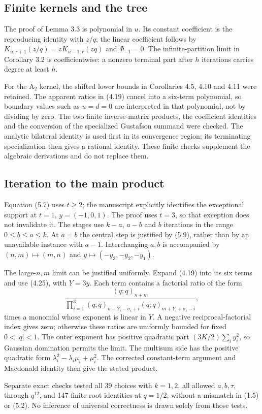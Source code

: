 \documentclass[10pt]{article}
\begin{document}
\subsection*{Finite kernels and the tree}
The proof of Lemma 3.3 is polynomial in \(u\). Its constant coefficient is the reproducing identity with \(z/q\); the linear coefficient follows by \(K_{n;r+1}(z/q)=zK_{n-1;r}(zq)\) and \(\Phi_{-1}=0\). The infinite-partition limit in Corollary 3.2 is coefficientwise: a nonzero terminal part after \(h\) iterations carries degree at least \(h\).\par
For the \(\mathrm A_2\) kernel, the shifted lower bounds in Corollaries 4.5, 4.10 and 4.11 were retained. The apparent ratios in (4.19) cancel into a six-term polynomial, so boundary values such as \(u=d=0\) are interpreted in that polynomial, not by dividing by zero. The two finite inverse-matrix products, the coefficient identities and the conversion of the specialized Gustafson summand were checked. The analytic bilateral identity is used first in its convergence region; its terminating specialization then gives a rational identity. These finite checks supplement the algebraic derivations and do not replace them.\par
\subsection*{Iteration to the main product}
Equation (5.7) uses \(t\ge2\); the manuscript explicitly identifies the exceptional support at \(t=1\), \(y=(-1,0,1)\). The proof uses \(t=3\), so that exception does not invalidate it. The stages use \(k-a\), \(a-b\) and \(b\) iterations in the range \(0\le b\le a\le k\). At \(a=b\) the central step is justified by (5.9), rather than by an unavailable instance with \(a-1\). Interchanging \(a,b\) is accompanied by \((n,m)\mapsto(m,n)\) and \(y\mapsto(-y_3,-y_2,-y_1)\).\par
The large-\(n,m\) limit can be justified uniformly. Expand (4.19) into its six terms and use (4.25), with \(Y=3y\). Each term contains a factorial ratio of the form \[\frac{(q;q)_{n+m}}
 {\prod_{i=1}^3
  (q;q)_{n-Y_i-\sigma_i+i}
  (q;q)_{m+Y_i+\sigma_i-i}},\] times a monomial whose exponent is linear in \(Y\). A negative reciprocal-factorial index gives zero; otherwise these ratios are uniformly bounded for fixed \(0<|q|<1\). The outer exponent has positive quadratic part \((3K/2)\sum_i y_i^2\), so Gaussian domination permits the limit. The multisum side has the positive quadratic form \(\lambda_i^2-\lambda_i\mu_i+\mu_i^2\). The corrected constant-term argument and Macdonald identity then give the stated product.\par
Separate exact checks tested all 39 choices with \(k=1,2\), all allowed \(a,b,\tau\), through \(q^{12}\), and 147 finite root identities at \(q=1/2\), without a mismatch in (1.5) or (5.2). No inference of universal correctness is drawn solely from those tests.\par
\end{document}
